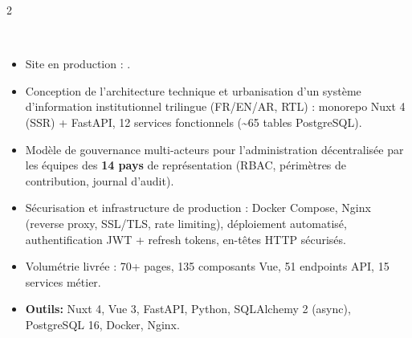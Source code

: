 \documentclass[10pt,a4paper,ragged2e,withhyper]{altacv}
\begin{document}
\begin{paracol}{2}
             \\

             \\


        \switchcolumn




            \begin{itemize}
                \item Site en production : .
                \item Conception de l'architecture technique et urbanisation d'un système d'information institutionnel trilingue (FR/EN/AR, RTL) : monorepo Nuxt 4 (SSR) + FastAPI, 12 services fonctionnels (\textasciitilde65 tables PostgreSQL).
                \item Modèle de gouvernance multi-acteurs pour l'administration décentralisée par les équipes des \textbf{14 pays} de représentation (RBAC, périmètres de contribution, journal d'audit).
                \item Sécurisation et infrastructure de production : Docker Compose, Nginx (reverse proxy, SSL/TLS, rate limiting), déploiement automatisé, authentification JWT + refresh tokens, en-têtes HTTP sécurisés.
                \item Volumétrie livrée : 70+ pages, 135 composants Vue, 51 endpoints API, 15 services métier.
                \item \textcolor{SecondaryColor}{\textbf{Outils: }} Nuxt 4, Vue 3, FastAPI, Python, SQLAlchemy 2 (async), PostgreSQL 16, Docker, Nginx.
            \end{itemize}
            \divider


\end{paracol}
\end{document}
